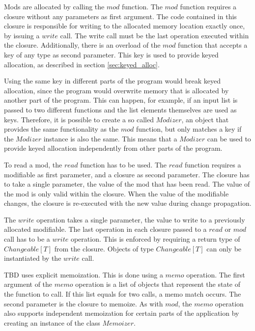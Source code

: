 Mods are allocated by calling the $mod$ function. The $mod$ function requires a closure without any parameters as first argument. The code contained in this closure is responsible for writing to the allocated memory location exactly once, by issuing a $write$ call. The write call must be the last operation executed within the closure. Additionally, there is an overload of the $mod$ function that accepts a key of any type as second parameter. This key is used to provide keyed allocation, as described in section \ref{sec:keyed_alloc}. 

Using the same key in different parts of the program would break keyed allocation, since the program would overwrite memory that is allocated by another part of the program. This can happen, for example, if an input list is passed to two different functions and the list elements themselves are used as keys. Therefore, it is possible to create a so called $Modizer$, an object that provides the same functionality as the $mod$ function, but only matches a key if the $Modizer$ instance is also the same. This means that a $Modizer$ can be used to provide keyed allocation independently from other parts of the program. 

To read a mod, the $read$ function has to be used. The $read$ function requires a modifiable as first parameter, and a closure as second parameter. The closure has to take a single parameter, the value of the mod that has been read. The value of the mod is only valid within the closure. When the value of the modifiable changes, the closure is re-executed with the new value during change propagation. 

The $write$ operation takes a single parameter, the value to write to a previously allocated modifiable. The last operation in each closure passed to a $read$ or $mod$ call has to be a $write$ operation. This is enforced by requiring a return type of $Changeable[T]$ from the closure. Objects of type $Changeable[T]$ can only be instantiated by the $write$ call. 

TBD uses explicit memoization. This is done using a $memo$ operation. The first argument of the $memo$ operation is a list of objects that represent the state of the function to call. If this list equals for two calls, a memo match occurs. The second parameter is the closure to memoize. As with $mod$, the $memo$ operation also supports independent memoization for certain parts of the application by creating an instance of the class $Memoizer$.


